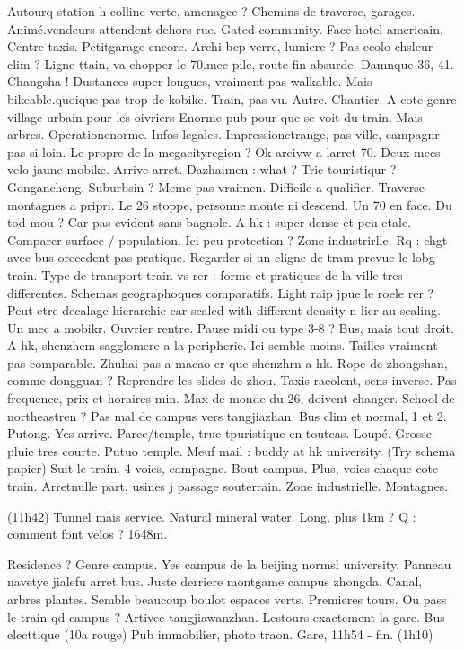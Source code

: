 Autourq station h colline verte, amenagee ?
Chemins de traverse, garages. Animé.vendeurs attendent dehors rue.
Gated community. Face hotel americain.
Centre taxis. Petitgarage encore. Archi bcp verre, lumiere ? Pas ecolo chsleur clim ?
Ligne ttain, va chopper le 70.mec pile, route fin absurde.
Damnque 36, 41. Changsha !
Dustances super longues, vraiment pas walkable. Mais bikeable.quoique pas trop de kobike. Train, pas vu. Autre.
Chantier. A cote genre village urbain pour les oivriers
Enorme pub pour que se voit du train. Mais arbres.
Operationenorme. Infos legales.
Impressionetrange, pas ville, campagnr pas si loin. Le propre de la megacityregion ?
Ok areivw a larret 70.
Deux mecs velo jaune-mobike.
Arrive arret. Dazhaimen : what ? Tric touristiqur ?
Gongancheng.
Suburbsin ? Meme pas vraimen. Difficile a qualifier.
Traverse montagnes a pripri. Le 26 stoppe, personne monte ni descend. Un 70 en face.
Du tod mou ? Car pas evident sans bagnole. A hk : super dense et peu etale. Comparer surface / population. Ici peu protection ?
Zone industrirlle. Rq : chgt avec bus orecedent pas pratique. Regarder si un eligne de tram prevue le lobg train. Type de transport train vs rer : forme et pratiques de la ville tres differentes. Schemas geographoques comparatifs. Light raip jpue le roele rer ? Peut etre decalage hierarchie car scaled with different density n lier au scaling.
Un mec a mobikr. Ouvrier rentre. Pause midi ou type 3-8 ? Bus, mais tout droit.
A hk, shenzhem sagglomere a la peripherie. Ici semble moins. Tailles vraiment pas comparable. Zhuhai pas a macao cr que shenzhrn a hk. Rope de zhongshan, comme dongguan ? Reprendre les slides de zhou.
Taxis racolent, sens inverse.
Pas frequence, prix et horaires min. Max de monde du 26, doivent changer. School de northeastren ? Pas mal de campus vers tangjiazhan. Bus clim et normal, 1 et 2.
Putong. Yes arrive.
Parce/temple, truc tpuristique en toutcas. Loupé.
Grosse pluie tres courte.
Putuo temple.
Meuf mail : buddy at hk university.
(Try schema papier)
Suit le train. 4 voies, campagne. Bout campus. Plus, voies chaque cote train.
Arretnulle part, usines j passage souterrain. Zone industrielle. Montagnes.

(11h42)
Tunnel mais service. Natural mineral water.
Long, plus 1km ? Q : comment font velos ? 1648m.

Residence ? Genre campus.
Yes campus de la beijing normsl university.
Panneau navetye jialefu arret bus.
Juste derriere montgame campus zhongda.
Canal, arbres plantes. Semble beaucoup boulot espaces verts.
Premieres tours. Ou pass le train qd campus ?
Artivee tangjiawanzhan. Lestours exactement la gare.
Bus electtique (10a rouge)
Pub immobilier, photo traon.
Gare, 11h54 - fin. (1h10)

